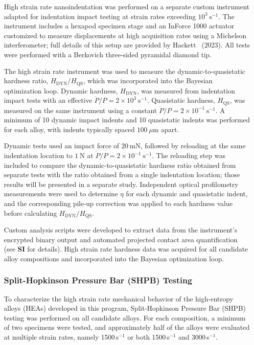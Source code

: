 High strain rate nanoindentation was performed on a separate custom instrument adapted for indentation impact testing at strain rates exceeding $10^{3}\ \mathrm{s^{-1}}$. The instrument includes a hexapod specimen stage and an InForce 1000 actuator customized to measure displacements at high acquisition rates using a Michelson interferometer; full details of this setup are provided by Hackett \etal\ (2023). All tests were performed with a Berkovich three-sided pyramidal diamond tip.

The high strain rate instrument was used to measure the dynamic-to-quasistatic hardness ratio, $H_{\mathrm{DYN}}/H_{\mathrm{QS}}$, which was incorporated into the Bayesian optimization loop. Dynamic hardness, $H_{\mathrm{DYN}}$, was measured from indentation impact tests with an effective $\dot{P}/P = 2 \times 10^{3}\ \mathrm{s^{-1}}$. Quasistatic hardness, $H_{\mathrm{QS}}$, was measured on the same instrument using a constant $\dot{P}/P = 2 \times 10^{-1}\ \mathrm{s^{-1}}$. A minimum of 10 dynamic impact indents and 10 quasistatic indents was performed for each alloy, with indents typically spaced $100\ \mu\mathrm{m}$ apart.

Dynamic tests used an impact force of $20\ \mathrm{mN}$, followed by reloading at the same indentation location to $1\ \mathrm{N}$ at $\dot{P}/P = 2 \times 10^{-1}\ \mathrm{s^{-1}}$. The reloading step was included to compare the dynamic-to-quasistatic hardness ratio obtained from separate tests with the ratio obtained from a single indentation location; those results will be presented in a separate study. Independent optical profilometry measurements were used to determine $\eta$ for each dynamic and quasistatic indent, and the corresponding pile-up correction was applied to each hardness value before calculating $H_{\mathrm{DYN}}/H_{\mathrm{QS}}$.

Custom analysis scripts were developed to extract data from the instrument's encrypted binary output and automated projected contact area quantification (see \textbf{SI} for details). High strain rate hardness data was acquired for all candidate alloy compositions and incorporated into the Bayesian optimization loop.


\subsubsection{Split-Hopkinson Pressure Bar (SHPB) Testing}

To characterize the high strain rate mechanical behavior of the high-entropy alloys (HEAs) developed in this program, Split-Hopkinson Pressure Bar (SHPB) testing was performed on all candidate alloys. For each composition, a minimum of two specimens were tested, and approximately half of the alloys were evaluated at multiple strain rates, namely 1500\,s$^{-1}$ or both 1500\,s$^{-1}$ and 3000\,s$^{-1}$.

